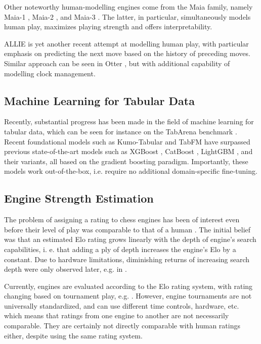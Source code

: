 \documentclass[sigconf,nonacm]{acmart}
\begin{document}
Other noteworthy human-modelling engines come from the Maia family, namely Maia-1 \cite{maia1}, Maia-2 \cite{maia2}, and Maia-3 \cite{maia3}. The latter, in particular, simultaneously models human play, maximizes playing strength and offers interpretability. 

ALLIE \cite{allie} is yet another recent attempt at modelling human play, with particular emphasis on predicting the next move based on the history of preceding moves. Similar approach can be seen in Otter \cite{otter}, but with additional capability of modelling clock management. 

\subsection{Machine Learning for Tabular Data}
\label{ml_tab}

Recently, substantial progress has been made in the field of machine learning for tabular data, which can be seen for instance on the TabArena benchmark \cite{tabarena}. Recent foundational models such as Kumo-Tabular \cite{kumo} and TabFM \cite{tabfm} have surpassed previous state-of-the-art models such as XGBoost \cite{xgboost}, CatBoost \cite{catboost}, LightGBM \cite{lightgbm}, and their variants, all based on the gradient boosting paradigm. Importantly, these models work out-of-the-box, i.e. require no additional domain-specific fine-tuning.

\subsection{Engine Strength Estimation}

The problem of assigning a rating to chess engines has been of interest even before their level of play was comparable to that of a human \cite{comprating1, comprating2}. The initial belief was that an estimated Elo rating grows linearly with the depth of engine's search capabilities, i. e. that adding a ply of depth increases the engine's Elo by a constant. Due to hardware limitations, diminishing returns of increasing search depth were only observed later, e.g. in \cite{comprating3}. 

Currently, engines are evaluated according to the Elo rating system, with rating changing based on tournament play, e.g. \cite{engine, engine2, engine3}. However, engine tournaments are not universally standardized, and can use different time controls, hardware, etc. which means that ratings from one engine to another are not necessarily comparable. They are certainly not directly comparable with human ratings either, despite using the same rating system. 
\end{document}
